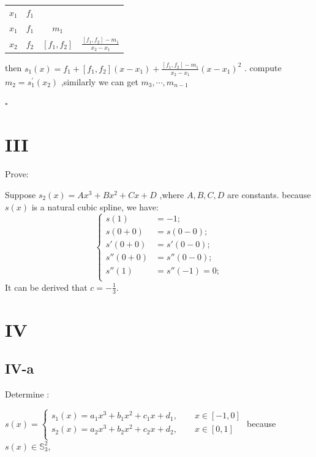 \documentclass[a4paper]{article}
\begin{document}
\begin{table}[h]
    \centering
    \begin{tabular}{c|ccc}
        
        $x_{1}$ &$f_{1}$ & & \\
        
        $x_{1}$ &$f_{1}$ &$m_{1}$ & \\
        
        $x_{2}$ &$f_{2}$ &$[f_{1}, f_{2}]$ &$\frac{[f_{1}, f_{2}] - m_{1}}{x_{2}-x_{1}}$  \\
        
    \end{tabular} 
\end{table}
then $s_{1}(x) = f_{1} + [f_{1}, f_{2}](x-x_{1}) + \frac{[f_{1}, f_{2}] - m_{1}}{x_{2}-x_{1}}(x-x_{1})^{2}$ .
compute $m_{2} = s^{'}_{1}(x_{2})$ ,similarly we can get $m_{3}, \cdots, m_{n-1}$

\begin{flushright} 
    $\square$ 
\end{flushright} 


\section*{III}
Prove:

Suppose $s_{2}(x) = Ax^{3}+Bx^{2}+Cx+D$ ,where $A,B,C,D$ are constants.
because $s(x)$ is a natural cubic spline, we have:
$$
\left\{
    \begin{array}{rl}
    s(1) &= -1;\\
    s(0+0) &= s(0-0);\\
    s'(0+0) &= s'(0-0);\\
    s''(0+0) &= s''(0-0);\\
    s''(1) &= s''(-1) = 0;\\
    \end{array}
\right.
$$
It can be derived that $c = -\frac{1}{3}$.



\section*{IV}

\subsection*{IV-a}
Determine :


$s(x) = 
\left\{
\begin{array}{rl}
s_{1}(x) = a_{1}x^{3} + b_{1}x^{2} + c_{1}x + d_{1} , \qquad x \in [-1,0]\\
s_{2}(x) = a_{2}x^{3} + b_{2}x^{2} + c_{2}x + d_{2} , \qquad x \in [0,1]\\
\end{array}
\right.
$
because $s(x) \in \mathbb{S}_{3}^{2}$, 
\end{document}

